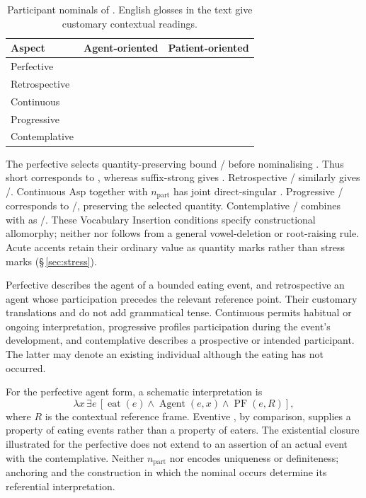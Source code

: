 \begin{table}[htbp]
\footnotesize
\caption{Participant nominals of  . English glosses
in the text give customary contextual readings.}\label{tab:participant-nominals}
\begin{tabularx}{\textwidth}{l L L}
\toprule
Aspect & Agent-oriented & Patient-oriented \\
\midrule
Perfective &  &  \\
Retrospective &  &  \\
Continuous &  &  \\
Progressive &  &  \\
Contemplative &  &  \\
\bottomrule
\end{tabularx}
\end{table}

The perfective selects quantity-preserving bound
/ before nominalising .
Thus short  corresponds to ,
whereas suffix-strong  gives .
Retrospective / similarly gives
/. Continuous Asp together with
$n_{\mathrm{part}}$ has joint direct-singular .
Progressive / corresponds to
/, preserving the selected quantity.
Contemplative / combines with 
as /. These Vocabulary Insertion conditions specify constructional
allomorphy; neither  nor  follows from a general
vowel-deletion or root-raising rule. Acute accents retain their ordinary value
as quantity marks rather than stress marks (§\,\ref{sec:stress}).

Perfective  describes the agent of a bounded eating event,
and retrospective  an agent whose participation precedes the
relevant reference point. Their customary translations 
and  do not add grammatical tense. Continuous
 permits habitual or ongoing interpretation, progressive
 profiles participation during the event's development, and
contemplative  describes a prospective or intended
participant. The latter may denote an existing individual although the eating
has not occurred.

For the perfective agent form, a schematic interpretation is
\[
 \lambda x\,\exists e\,[\operatorname{eat}(e)\land
 \operatorname{Agent}(e,x)\land\operatorname{PF}(e,R)],
\]
where $R$ is the contextual reference frame. Eventive , by
comparison, supplies a property of eating events rather than a property of
eaters. The existential closure illustrated for the perfective does not extend
to an assertion of an actual event with the contemplative. Neither
$n_{\mathrm{part}}$ nor  encodes uniqueness or definiteness;
anchoring and the construction in which the nominal occurs determine its
referential interpretation.

